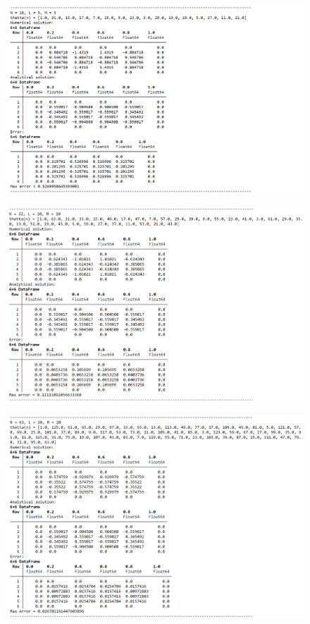 \documentclass[12pt,a4paper, titlepage]{article}
\begin{document}
\begin{figure}[H]
	\centering
	\includegraphics[width = 1.0\textwidth]{lab_5_0.png}
\end{figure}
\begin{figure}[H]
	\centering
	\includegraphics[width = 1.0\textwidth]{lab5_1.png}
\end{figure}

\begin{figure}[H]
	\centering
	\includegraphics[width = 1.0\textwidth]{lab5_2.png}
\end{figure}
\end{document}
